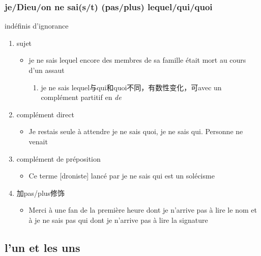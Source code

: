 \documentclass[UTF8]{report}
\begin{document}
\subsubsection{je/Dieu/on ne sai(s/t) (pas/plus) lequel/qui/quoi}
indéfinis d’ignorance 
\begin{enumerate}
    \item sujet
    \begin{itemize}
        \item je ne sais lequel encore des membres de sa famille était mort au cours d’un assaut
        \begin{enumerate}
            \item je ne sais lequel与qui和quoi不同，有数性变化，可avec un complément partitif en \textit{de}
        \end{enumerate}
    \end{itemize}
    \item complément direct
    \begin{itemize}
        \item Je restais seule à attendre je ne sais quoi, je ne sais qui. Personne ne venait
    \end{itemize}
    \item complément de préposition
    \begin{itemize}
        \item Ce terme [droniste] lancé par je ne sais qui est un solécisme
    \end{itemize}
    \item 加pas/plus修饰
    \begin{itemize}
        \item Merci à une fan de la première heure dont je n’arrive pas à lire le nom et à je ne sais pas qui dont je n’arrive pas à lire la signature
    \end{itemize}
\end{enumerate}

\subsection{l’un et les uns}
\end{document}
